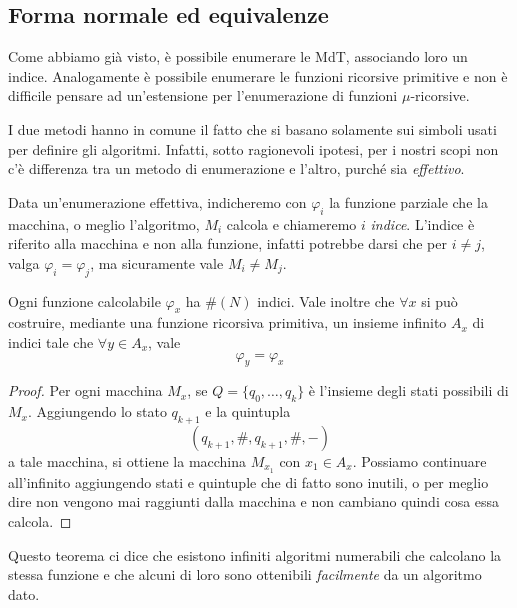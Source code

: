 \subsection{Forma normale ed equivalenze}
Come abbiamo già visto, è possibile enumerare le MdT, associando
loro un indice. Analogamente è possibile enumerare le funzioni
ricorsive primitive e non è difficile pensare ad un'estensione
per l'enumerazione di funzioni $\mu$-ricorsive.

I due metodi hanno in comune il fatto che si basano solamente
sui simboli usati per definire gli algoritmi. Infatti, sotto
ragionevoli ipotesi, per i nostri scopi non c'è differenza tra
un metodo di enumerazione e l'altro, purché sia \emph{effettivo}.

Data un'enumerazione effettiva, indicheremo con $\varphi_i$ la
funzione parziale che la macchina, o meglio l'algoritmo, $M_i$
calcola e chiameremo $i$ \emph{indice}. L'indice è riferito
alla macchina e non alla funzione, infatti potrebbe darsi che
per $i \neq j$, valga $\varphi_i = \varphi_j$, ma sicuramente
vale $M_i \neq M_j$.

\begin{theorem} \label{th: padding lemma}
	Ogni funzione calcolabile $\varphi_x$ ha $\# (N)$ indici.
	Vale inoltre che $\forall x$ si può costruire, mediante una
	funzione ricorsiva primitiva, un insieme infinito $A_x$ di
	indici tale che $\forall y \in A_x$, vale
	\[ \varphi_y = \varphi_x \]
	\begin{proof}
		Per ogni macchina $M_x$, se $Q = \{ q_0, \dots, q_k \}$
		è l'insieme degli stati possibili di $M_x$. Aggiungendo
		lo stato $q_{k+1}$ e la quintupla
		\[ (q_{k+1}, \#, q_{k+1}, \#, -) \]
		a tale macchina, si ottiene la macchina $M_{x_1}$ con
		$x_1 \in A_x$. Possiamo continuare all'infinito
		aggiungendo stati e quintuple che di fatto sono inutili,
		o per meglio dire non vengono mai raggiunti dalla
		macchina e non cambiano quindi cosa essa calcola.
	\end{proof}
\end{theorem}

Questo teorema ci dice che esistono infiniti algoritmi
numerabili che calcolano la stessa funzione e che alcuni di
loro sono ottenibili \emph{facilmente} da un algoritmo dato.

